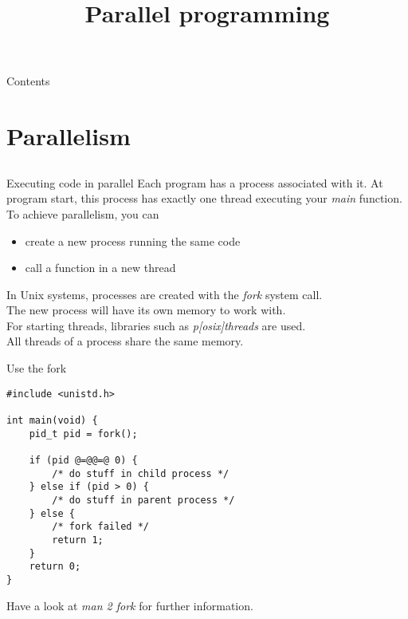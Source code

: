 
\newcommand{\topic}{
	Parallel programming
}

\title{\topic}
\supertitle{\course}
\date{}



\maketitle

\begin{frame}{Contents}
	\tableofcontents
\end{frame}

\section{Parallelism}
\subsection{}
\begin{frame}{Executing code in parallel}
    Each program has a process associated with it. At program start, this process has
    exactly one thread executing your \textit{main} function.\\
    \bigskip
    To achieve parallelism, you can
    \begin{itemize}
    		\item create a new process running the same code
    		\item call a function in a new thread
    \end{itemize}
    \bigskip
    In Unix systems, processes are created with the \textit{fork} system call.\\
    The new process will have its own memory to work with.\\
    For starting threads, libraries such as \textit{p[osix]threads} are used.\\
    All threads of a process share the same memory.
\end{frame}

\begin{frame}[fragile]{Use the fork}
    \begin{lstlisting}
#include <unistd.h>

int main(void) {
    pid_t pid = fork();

    if (pid @=@@=@ 0) {
        /* do stuff in child process */
    } else if (pid > 0) {
        /* do stuff in parent process */
    } else {
        /* fork failed */
        return 1;
    }
    return 0;
}
\end{lstlisting}
    Have a look at \textit{man 2 fork} for further information.
\end{frame}

